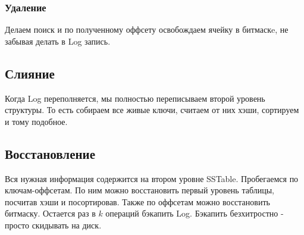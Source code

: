       \subsubsection*{Удаление}
        Делаем поиск и по полученному оффсету освобождаем ячейку в битмаскe, не забывая делать в Log запись.

      \subsection*{Слияние}
        Когда Log переполняется, мы полностью переписываем второй уровень структуры. То есть собираем все живые ключи, считаем от них хэши, сортируем и тому подобное.

      \subsection*{Восстановление}
        Вся нужная информация содержится на втором уровне SSTable. Пробегаемся по ключам-оффсетам. По ним можно восстановить первый уровень таблицы, посчитав хэши и посортировав. Также по оффсетам можно 
        восстановить битмаску. Остается раз в $k$ операций бэкапить Log. Бэкапить безхитростно - просто скидывать на диск.
